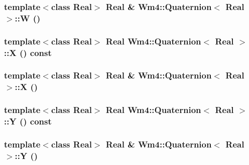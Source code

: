 \subsubsection{\setlength{\rightskip}{0pt plus 5cm}template$<$class Real$>$ Real \& {\bf Wm4::Quaternion}$<$ Real $>$::W ()\hspace{0.3cm}{\tt  [inline]}}\label{classWm4_1_1Quaternion_db69eb9cabe94f02734988a2e01a3484}


\subsubsection{\setlength{\rightskip}{0pt plus 5cm}template$<$class Real$>$ Real {\bf Wm4::Quaternion}$<$ Real $>$::X () const\hspace{0.3cm}{\tt  [inline]}}\label{classWm4_1_1Quaternion_bf365342d7c0e96d23673021f8e1087a}


\subsubsection{\setlength{\rightskip}{0pt plus 5cm}template$<$class Real$>$ Real \& {\bf Wm4::Quaternion}$<$ Real $>$::X ()\hspace{0.3cm}{\tt  [inline]}}\label{classWm4_1_1Quaternion_24b4aa16579caca3779d71ddcbd5e131}


\subsubsection{\setlength{\rightskip}{0pt plus 5cm}template$<$class Real$>$ Real {\bf Wm4::Quaternion}$<$ Real $>$::Y () const\hspace{0.3cm}{\tt  [inline]}}\label{classWm4_1_1Quaternion_d9ff560670b20d0f52270e0252fd95f2}


\subsubsection{\setlength{\rightskip}{0pt plus 5cm}template$<$class Real$>$ Real \& {\bf Wm4::Quaternion}$<$ Real $>$::Y ()\hspace{0.3cm}{\tt  [inline]}}\label{classWm4_1_1Quaternion_ab23f136c17695b188d4768ae9447b8a}


